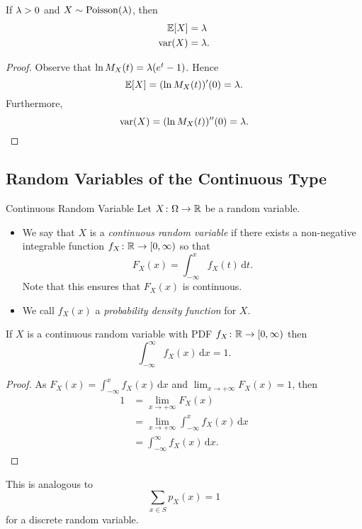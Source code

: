 \documentclass[class=article, crop=false]{standalone}
\begin{document}
  \begin{theorem}{}
    If $\lambda > 0$ and $X\sim \operatorname{Poisson}(\lambda)$, then
    \begin{align*}
      \mathbb{E}[X] &= \lambda \\
      \operatorname{var}(X) &= \lambda.
    \end{align*}
    \begin{proof}
      Observe that $\ln M_X(t) = \lambda (e^t - 1)$. Hence
      \[
        \mathbb{E}[X] = (\ln M_X(t))'(0) = \lambda.
      \]
      Furthermore,
      \[
        \operatorname{var}(X) = (\ln M_X(t))''(0) = \lambda.
      \]
    \end{proof}
  \end{theorem}
  \subsection{Random Variables of the Continuous Type}
  \begin{definition}{Continuous Random Variable}
    Let $X\colon \Omega\to \mathbb{R}$ be a random variable.
    \begin{itemize}
      \item We say that $X$ is a \emph{continuous random variable} if there exists a non-negative integrable function $f_X\colon \mathbb{R}\to [0, \infty)$ so that
      \[
        F_X(x) = \int_{-\infty}^{x}f_X(t) \,\mathrm dt.
      \]
      Note that this ensures that $F_X(x)$ is continuous.
      \item We call $f_X(x)$ a \emph{probability density function} for $X$.
    \end{itemize}
  \end{definition}
  \begin{theorem}{}
    If $X$ is a continuous random variable with PDF $f_X\colon \mathbb{R}\to [0, \infty)$ then
    \[
      \int_{-\infty}^{\infty}f_X(x) \,\mathrm dx = 1.
    \]
    \begin{proof}
      As $\displaystyle F_X(x) = \int_{-\infty}^{x}f_X(x) \,\mathrm dx$ and $\displaystyle \lim_{x\to +\infty} F_X(x) = 1$, then
      \begin{align*}
        1 &= \lim_{x\to +\infty} F_X(x) \\
          &= \lim_{x\to +\infty} \int_{-\infty}^{x}f_X(x) \,\mathrm dx \\
          &=\int_{-\infty}^{\infty}f_X(x) \,\mathrm dx.
      \end{align*}
    \end{proof}
  \end{theorem}
  \begin{note}{}
    This is analogous to
    \[
      \sum_{x\in S}p_X(x) = 1
    \]
    for a discrete random variable.
  \end{note}
\end{document}
